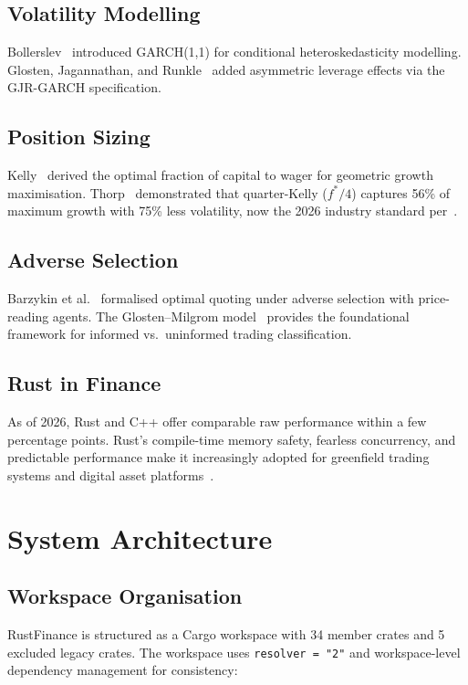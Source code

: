\documentclass[11pt]{article}
\theoremstyle{definition}
\begin{document}
\subsection{Volatility Modelling}
Bollerslev~\cite{bollerslev1986} introduced GARCH(1,1) for
conditional heteroskedasticity modelling. Glosten, Jagannathan,
and Runkle~\cite{glosten1993} added asymmetric leverage effects
via the GJR-GARCH specification.

\subsection{Position Sizing}
Kelly~\cite{kelly1956} derived the optimal fraction of capital
to wager for geometric growth maximisation. Thorp~\cite{thorp2008}
demonstrated that quarter-Kelly ($f^*/4$) captures 56\% of maximum
growth with 75\% less volatility, now the 2026 industry standard
per~\cite{polyswarm2026}.

\subsection{Adverse Selection}
Barzykin et al.~\cite{barzykin2025} formalised optimal quoting under
adverse selection with price-reading agents. The Glosten--Milgrom
model~\cite{glosten1985} provides the foundational framework for
informed vs.\ uninformed trading classification.

\subsection{Rust in Finance}
As of 2026, Rust and C++ offer comparable raw performance within a
few percentage points. Rust's compile-time memory safety, fearless
concurrency, and predictable performance make it increasingly adopted
for greenfield trading systems and digital asset platforms~\cite{rusttrading2026}.

\section{System Architecture}
\label{sec:arch}

\subsection{Workspace Organisation}

RustFinance is structured as a Cargo workspace with 34 member crates
and 5 excluded legacy crates. The workspace uses \texttt{resolver = "2"}
and workspace-level dependency management for consistency:
\end{document}
